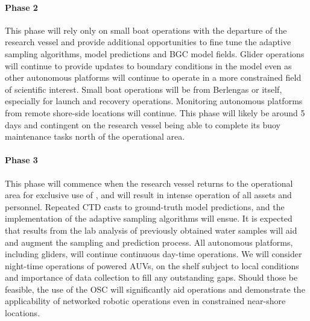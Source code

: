 \paragraph{Phase 2} This phase will rely only on small boat operations
with the departure of the research vessel and provide additional
opportunities to fine tune the adaptive sampling algorithms, model
predictions and BGC model fields. Glider operations will continue to
provide updates to boundary conditions in the model even as other
autonomous platforms will continue to operate in a more constrained
field of scientific interest. Small boat operations will be from
Berlengas or \naz itself, especially for launch and recovery operations.
Monitoring autonomous platforms from remote shore-side locations will
continue. This phase will likely be around 5 days and contingent on the
research vessel being able to complete its buoy maintenance tasks north
of the \naz operational area.

\paragraph{Phase 3} This phase will commence when the research vessel
returns to the \naz operational area for exclusive use of \proje, and
will result in intense operation of all assets and personnel. Repeated
CTD casts to ground-truth model predictions, and the implementation of
the adaptive sampling algorithms will ensue. It is expected that results
from the lab analysis of previously obtained water samples will aid and
augment the sampling and prediction process. All autonomous platforms,
including gliders, will continue continuous day-time operations. We will
consider night-time operations of powered AUVs, on the shelf subject to
local conditions and importance of data collection to fill any
outstanding gaps. Should those be feasible, the use of the OSC will
significantly aid operations and demonstrate the applicability of
networked robotic operations even in constrained near-shore locations. 


